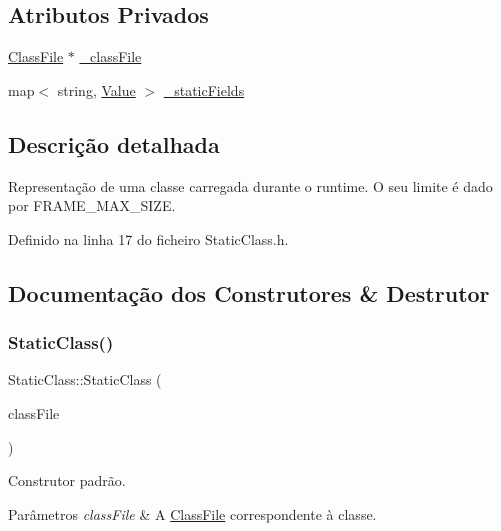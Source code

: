 \subsection*{Atributos Privados}
\begin{DoxyCompactItemize}
\item 
\hyperlink{classClassFile}{Class\+File} $\ast$ \hyperlink{classStaticClass_ae54948d5ec18075dd5b68c7faf4ccc8b}{\+\_\+class\+File}
\item 
map$<$ string, \hyperlink{structValue}{Value} $>$ \hyperlink{classStaticClass_a3f328810c97cb2b6e15830e3c1cd6289}{\+\_\+static\+Fields}
\end{DoxyCompactItemize}


\subsection{Descrição detalhada}
Representação de uma classe carregada durante o runtime. O seu limite é dado por {\ttfamily F\+R\+A\+M\+E\+\_\+\+M\+A\+X\+\_\+\+S\+I\+ZE}. 

Definido na linha 17 do ficheiro Static\+Class.\+h.



\subsection{Documentação dos Construtores \& Destrutor}
\mbox{\label{classStaticClass_a6c0e4d8842888a97160f1e815c8e6ac3}} 
\subsubsection{\texorpdfstring{Static\+Class()}{StaticClass()}}
{\footnotesize\ttfamily Static\+Class\+::\+Static\+Class (\begin{DoxyParamCaption}\item[{\hyperlink{classClassFile}{Class\+File} $\ast$}]{class\+File }\end{DoxyParamCaption})}



Construtor padrão. 


\begin{DoxyParams}{Parâmetros}
{\em class\+File} & A {\ttfamily \hyperlink{classClassFile}{Class\+File}} correspondente à classe. \\
\hline
\end{DoxyParams}


